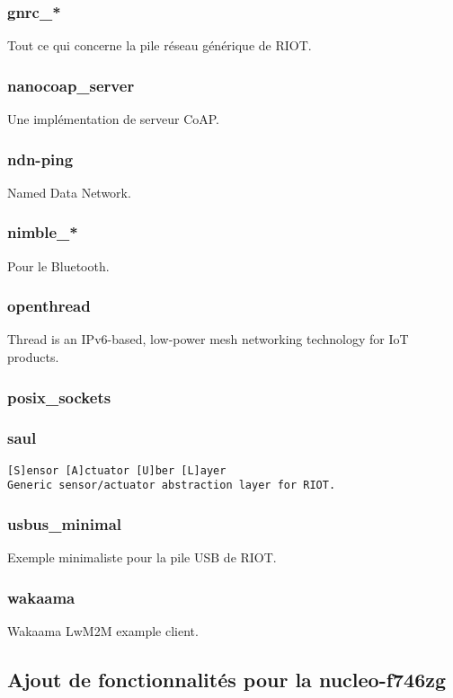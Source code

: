 \subsubsection{gnrc\_*}
Tout ce qui concerne la pile réseau générique de RIOT.

\subsubsection{nanocoap\_server}
Une implémentation de serveur CoAP.

\subsubsection{ndn-ping}
Named Data Network.

\subsubsection{nimble\_*}
Pour le Bluetooth.

\subsubsection{openthread}
Thread is an IPv6-based, low-power mesh networking technology for IoT
products.

\subsubsection{posix\_sockets}

\subsubsection{saul}
\begin{verbatim}
[S]ensor [A]ctuator [U]ber [L]ayer
Generic sensor/actuator abstraction layer for RIOT. 
\end{verbatim}

\subsubsection{usbus\_minimal}
Exemple minimaliste pour la pile USB de RIOT.

\subsubsection{wakaama}
Wakaama LwM2M example client.



\subsection{Ajout de fonctionnalités pour la nucleo-f746zg}











